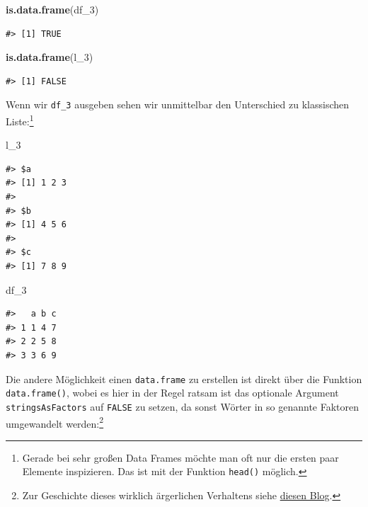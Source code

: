 \documentclass[]{book}
\newenvironment{Shaded}{\begin{snugshade}}{\end{snugshade}}
\newcommand{\KeywordTok}[1]{\textcolor[rgb]{0.13,0.29,0.53}{\textbf{#1}}}
\newcommand{\DecValTok}[1]{\textcolor[rgb]{0.00,0.00,0.81}{#1}}
\newcommand{\NormalTok}[1]{#1}
\let\rmarkdownfootnote\footnote%
\def\footnote{\protect\rmarkdownfootnote}
\begin{document}
\begin{Shaded}
\begin{Highlighting}[]
\KeywordTok{is.data.frame}\NormalTok{(df_}\DecValTok{3}\NormalTok{)}
\end{Highlighting}
\end{Shaded}

\begin{verbatim}
#> [1] TRUE
\end{verbatim}

\begin{Shaded}
\begin{Highlighting}[]
\KeywordTok{is.data.frame}\NormalTok{(l_}\DecValTok{3}\NormalTok{)}
\end{Highlighting}
\end{Shaded}

\begin{verbatim}
#> [1] FALSE
\end{verbatim}

Wenn wir \texttt{df\_3} ausgeben sehen wir unmittelbar den Unterschied
zu klassischen Liste:\footnote{Gerade bei sehr großen Data Frames möchte
  man oft nur die ersten paar Elemente inspizieren. Das ist mit der
  Funktion \texttt{head()} möglich.}

\begin{Shaded}
\begin{Highlighting}[]
\NormalTok{l_}\DecValTok{3}
\end{Highlighting}
\end{Shaded}

\begin{verbatim}
#> $a
#> [1] 1 2 3
#> 
#> $b
#> [1] 4 5 6
#> 
#> $c
#> [1] 7 8 9
\end{verbatim}

\begin{Shaded}
\begin{Highlighting}[]
\NormalTok{df_}\DecValTok{3}
\end{Highlighting}
\end{Shaded}

\begin{verbatim}
#>   a b c
#> 1 1 4 7
#> 2 2 5 8
#> 3 3 6 9
\end{verbatim}

Die andere Möglichkeit einen \texttt{data.frame} zu erstellen ist direkt
über die Funktion \texttt{data.frame()}, wobei es hier in der Regel
ratsam ist das optionale Argument \texttt{stringsAsFactors} auf
\texttt{FALSE} zu setzen, da sonst Wörter in so genannte Faktoren
umgewandelt werden:\footnote{Zur Geschichte dieses wirklich ärgerlichen
  Verhaltens siehe
  \href{https://simplystatistics.org/2015/07/24/stringsasfactors-an-unauthorized-biography/}{diesen
  Blog}.}
\end{document}
